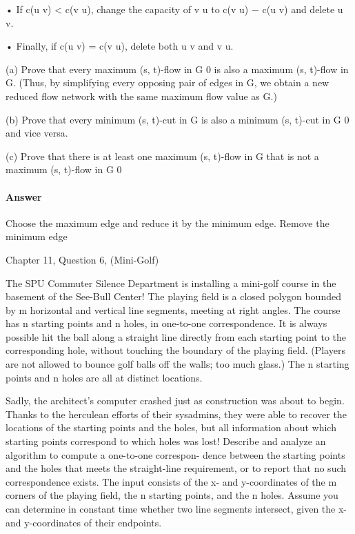 \documentclass{article}
\begin{document}
• If c(u  v) < c(v  u), change the capacity of v  u to c(v  u) − c(u  v)
and delete u  v.

• Finally, if c(u  v) = c(v  u), delete both u  v and v  u.

(a) Prove that every maximum (s, t)-flow in G 0 is also a maximum (s, t)-flow
in G. (Thus, by simplifying every opposing pair of edges in G, we obtain
a new reduced flow network with the same maximum flow value as G.)

(b) Prove that every minimum (s, t)-cut in G is also a minimum (s, t)-cut
in G 0 and vice versa.

(c) Prove that there is at least one maximum (s, t)-flow in G that is not a
maximum (s, t)-flow in G 0

\paragraph{Answer}

Choose the maximum edge and reduce it by the minimum edge. Remove the minimum edge


\collab{\todo{}}
\nextprob{}

Chapter 11, Question 6, (Mini-Golf)

The SPU Commuter Silence Department is installing a mini-golf course in
the basement of the See-Bull Center! The playing field is a closed polygon
bounded by m horizontal and vertical line segments, meeting at right angles.
The course has n starting points and n holes, in one-to-one correspondence.
It is always possible hit the ball along a straight line directly from each
starting point to the corresponding hole, without touching the boundary
of the playing field. (Players are not allowed to bounce golf balls off the
walls; too much glass.) The n starting points and n holes are all at distinct
locations.

Sadly, the architect’s computer crashed just as construction was about to
begin. Thanks to the herculean efforts of their sysadmins, they were able to
recover the locations of the starting points and the holes, but all information
about which starting points correspond to which holes was lost!
Describe and analyze an algorithm to compute a one-to-one correspon-
dence between the starting points and the holes that meets the straight-line
requirement, or to report that no such correspondence exists. The input
consists of the x- and y-coordinates of the m corners of the playing field, the
n starting points, and the n holes. Assume you can determine in constant
time whether two line segments intersect, given the x- and y-coordinates
of their endpoints.
\end{document}
